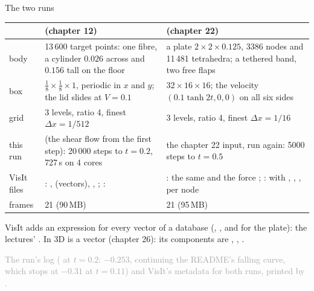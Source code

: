 \documentclass[aspectratio=169,11pt]{beamer}
\newcommand{\sourcecredit}[1]{\vfill\begin{flushright}\tiny\textcolor{DarkGray}{#1}\end{flushright}}
\begin{document}
\begin{frame}{The two runs}
\label{fr:data}
\scriptsize
\begin{tabular}{@{}L{0.17\textwidth}L{0.38\textwidth}L{0.38\textwidth}@{}}
\toprule
 &  (chapter 12) &  (chapter 22) \\
\midrule
body & 13\,600 target points: one fibre, a cylinder $0.026$ across and $0.156$ tall on the floor & a plate $2 \times 2 \times 0.125$, 3386 nodes and 11\,481 tetrahedra; a tethered band, two free flaps \\
box & $\frac18 \times \frac18 \times 1$, periodic in $x$ and $y$; the lid slides at $V = 0.1$ & $32 \times 16 \times 16$; the velocity $(0.1\tanh 2t, 0, 0)$ on all six sides \\
grid & 3 levels, ratio 4, finest $\Delta x = 1/512$ & 3 levels, ratio 4, finest $\Delta x = 1/16$ \\
this run &  (the shear flow from the first step): 20\,000 steps to $t = 0.2$, 727\,s on 4 cores & the chapter 22 input, run again: 5000 steps to $t = 0.5$ \\
VisIt files & : ,  (vectors), , ; :  & : the same and the force ; :  with , , ,  per node \\
frames & 21 (90\,MB) & 21 (95\,MB) \\
\bottomrule
\end{tabular}

\vspace{2mm}
VisIt adds an expression  for every vector of a database (, , and  for the plate): the lectures' . In 3D  is a vector (chapter 26): its components are , , .
\sourcecredit{The run's log ( at $t = 0.2$: $-0.253$, continuing the README's falling curve, which stops at $-0.31$ at $t = 0.11$) and VisIt's metadata for both runs, printed by \code{visit\_3d.py}.}
\end{frame}
\end{document}

